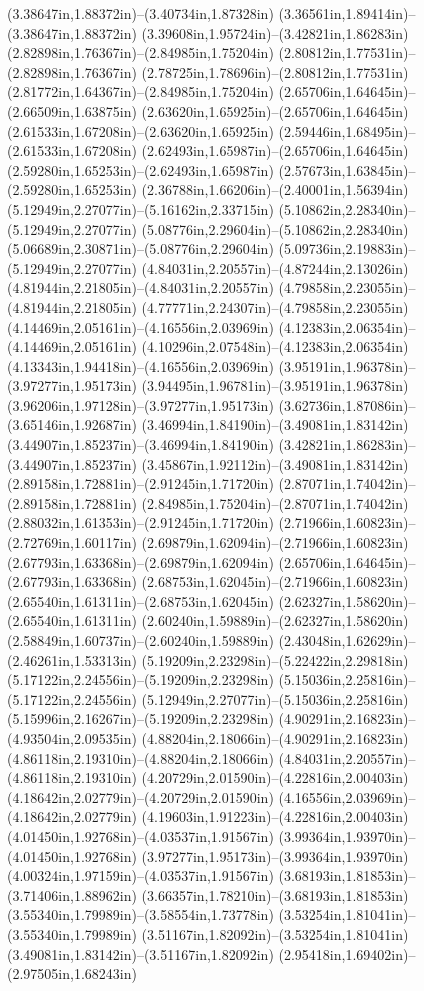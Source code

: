 (3.38647in,1.88372in)--(3.40734in,1.87328in) (3.36561in,1.89414in)--(3.38647in,1.88372in) (3.39608in,1.95724in)--(3.42821in,1.86283in) (2.82898in,1.76367in)--(2.84985in,1.75204in) (2.80812in,1.77531in)--(2.82898in,1.76367in) (2.78725in,1.78696in)--(2.80812in,1.77531in) (2.81772in,1.64367in)--(2.84985in,1.75204in) (2.65706in,1.64645in)--(2.66509in,1.63875in) (2.63620in,1.65925in)--(2.65706in,1.64645in) (2.61533in,1.67208in)--(2.63620in,1.65925in) (2.59446in,1.68495in)--(2.61533in,1.67208in) (2.62493in,1.65987in)--(2.65706in,1.64645in) (2.59280in,1.65253in)--(2.62493in,1.65987in) (2.57673in,1.63845in)--(2.59280in,1.65253in) (2.36788in,1.66206in)--(2.40001in,1.56394in) (5.12949in,2.27077in)--(5.16162in,2.33715in) (5.10862in,2.28340in)--(5.12949in,2.27077in) (5.08776in,2.29604in)--(5.10862in,2.28340in) (5.06689in,2.30871in)--(5.08776in,2.29604in) (5.09736in,2.19883in)--(5.12949in,2.27077in) (4.84031in,2.20557in)--(4.87244in,2.13026in) (4.81944in,2.21805in)--(4.84031in,2.20557in) (4.79858in,2.23055in)--(4.81944in,2.21805in) (4.77771in,2.24307in)--(4.79858in,2.23055in) (4.14469in,2.05161in)--(4.16556in,2.03969in) (4.12383in,2.06354in)--(4.14469in,2.05161in) (4.10296in,2.07548in)--(4.12383in,2.06354in) (4.13343in,1.94418in)--(4.16556in,2.03969in) (3.95191in,1.96378in)--(3.97277in,1.95173in) (3.94495in,1.96781in)--(3.95191in,1.96378in) (3.96206in,1.97128in)--(3.97277in,1.95173in) (3.62736in,1.87086in)--(3.65146in,1.92687in) (3.46994in,1.84190in)--(3.49081in,1.83142in) (3.44907in,1.85237in)--(3.46994in,1.84190in) (3.42821in,1.86283in)--(3.44907in,1.85237in) (3.45867in,1.92112in)--(3.49081in,1.83142in) (2.89158in,1.72881in)--(2.91245in,1.71720in) (2.87071in,1.74042in)--(2.89158in,1.72881in) (2.84985in,1.75204in)--(2.87071in,1.74042in) (2.88032in,1.61353in)--(2.91245in,1.71720in) (2.71966in,1.60823in)--(2.72769in,1.60117in) (2.69879in,1.62094in)--(2.71966in,1.60823in) (2.67793in,1.63368in)--(2.69879in,1.62094in) (2.65706in,1.64645in)--(2.67793in,1.63368in) (2.68753in,1.62045in)--(2.71966in,1.60823in) (2.65540in,1.61311in)--(2.68753in,1.62045in) (2.62327in,1.58620in)--(2.65540in,1.61311in) (2.60240in,1.59889in)--(2.62327in,1.58620in) (2.58849in,1.60737in)--(2.60240in,1.59889in) (2.43048in,1.62629in)--(2.46261in,1.53313in) (5.19209in,2.23298in)--(5.22422in,2.29818in) (5.17122in,2.24556in)--(5.19209in,2.23298in) (5.15036in,2.25816in)--(5.17122in,2.24556in) (5.12949in,2.27077in)--(5.15036in,2.25816in) (5.15996in,2.16267in)--(5.19209in,2.23298in) (4.90291in,2.16823in)--(4.93504in,2.09535in) (4.88204in,2.18066in)--(4.90291in,2.16823in) (4.86118in,2.19310in)--(4.88204in,2.18066in) (4.84031in,2.20557in)--(4.86118in,2.19310in) (4.20729in,2.01590in)--(4.22816in,2.00403in) (4.18642in,2.02779in)--(4.20729in,2.01590in) (4.16556in,2.03969in)--(4.18642in,2.02779in) (4.19603in,1.91223in)--(4.22816in,2.00403in) (4.01450in,1.92768in)--(4.03537in,1.91567in) (3.99364in,1.93970in)--(4.01450in,1.92768in) (3.97277in,1.95173in)--(3.99364in,1.93970in) (4.00324in,1.97159in)--(4.03537in,1.91567in) (3.68193in,1.81853in)--(3.71406in,1.88962in) (3.66357in,1.78210in)--(3.68193in,1.81853in) (3.55340in,1.79989in)--(3.58554in,1.73778in) (3.53254in,1.81041in)--(3.55340in,1.79989in) (3.51167in,1.82092in)--(3.53254in,1.81041in) (3.49081in,1.83142in)--(3.51167in,1.82092in) (2.95418in,1.69402in)--(2.97505in,1.68243in) 